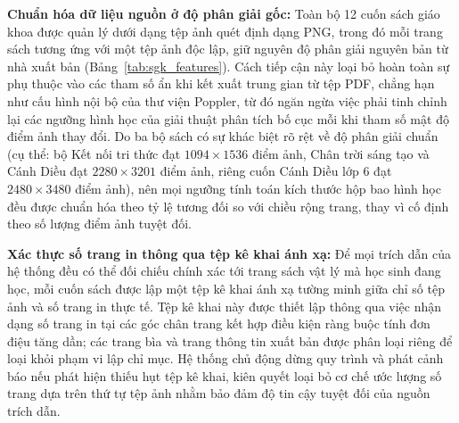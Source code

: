 \textbf{Chuẩn hóa dữ liệu nguồn ở độ phân giải gốc:} Toàn bộ 12 cuốn sách giáo khoa được quản lý dưới dạng tệp ảnh quét định dạng PNG, trong đó mỗi trang sách tương ứng với một tệp ảnh độc lập, giữ nguyên độ phân giải nguyên bản từ nhà xuất bản (Bảng~\ref{tab:sgk_features}). Cách tiếp cận này loại bỏ hoàn toàn sự phụ thuộc vào các tham số ẩn khi kết xuất trung gian từ tệp PDF, chẳng hạn như cấu hình nội bộ của thư viện Poppler, từ đó ngăn ngừa việc phải tinh chỉnh lại các ngưỡng hình học của giải thuật phân tích bố cục mỗi khi tham số mật độ điểm ảnh thay đổi. Do ba bộ sách có sự khác biệt rõ rệt về độ phân giải chuẩn (cụ thể: bộ Kết nối tri thức đạt $1094 \times 1536$ điểm ảnh, Chân trời sáng tạo và Cánh Diều đạt $2280 \times 3201$ điểm ảnh, riêng cuốn Cánh Diều lớp 6 đạt $2480 \times 3480$ điểm ảnh), nên mọi ngưỡng tính toán kích thước hộp bao hình học đều được chuẩn hóa theo tỷ lệ tương đối so với chiều rộng trang, thay vì cố định theo số lượng điểm ảnh tuyệt đối.

\textbf{Xác thực số trang in thông qua tệp kê khai ánh xạ:} Để mọi trích dẫn của hệ thống đều có thể đối chiếu chính xác tới trang sách vật lý mà học sinh đang học, mỗi cuốn sách được lập một tệp kê khai ánh xạ tường minh giữa chỉ số tệp ảnh và số trang in thực tế. Tệp kê khai này được thiết lập thông qua việc nhận dạng số trang in tại các góc chân trang kết hợp điều kiện ràng buộc tính đơn điệu tăng dần; các trang bìa và trang thông tin xuất bản được phân loại riêng để loại khỏi phạm vi lập chỉ mục. Hệ thống chủ động dừng quy trình và phát cảnh báo nếu phát hiện thiếu hụt tệp kê khai, kiên quyết loại bỏ cơ chế ước lượng số trang dựa trên thứ tự tệp ảnh nhằm bảo đảm độ tin cậy tuyệt đối của nguồn trích dẫn.

